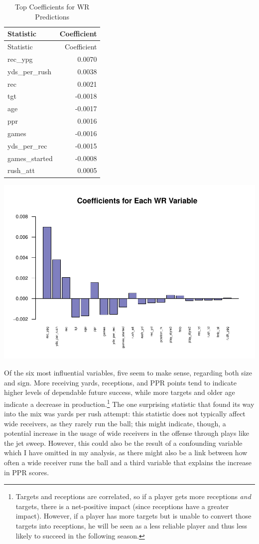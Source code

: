 \documentclass[
]{article}
\begin{document}
\begin{longtable}[]{@{}lr@{}}
\caption{Top Coefficients for WR Predictions}\tabularnewline
\toprule
Statistic & Coefficient \\
\midrule
\endfirsthead
\toprule
Statistic & Coefficient \\
\midrule
\endhead
rec\_ypg & 0.0070 \\
yds\_per\_rush & 0.0038 \\
rec & 0.0021 \\
tgt & -0.0018 \\
age & -0.0017 \\
ppr & 0.0016 \\
games & -0.0016 \\
yds\_per\_rec & -0.0015 \\
games\_started & -0.0008 \\
rush\_att & 0.0005 \\
\bottomrule
\end{longtable}

\begin{center}\includegraphics[width=0.85\linewidth]{stats_199_final_report_files/figure-latex/unnamed-chunk-14-1} \end{center}

\pagebreak

Of the six most influential variables, five seem to make sense,
regarding both size and sign. More receiving yards, receptions, and PPR
points tend to indicate higher levels of dependable future success,
while more targets and older age indicate a decrease in
production.\footnote{Targets and receptions are correlated, so if a
  player gets more receptions \emph{and} targets, there is a
  net-positive impact (since receptions have a greater impact). However,
  if a player has more targets but is unable to convert those targets
  into receptions, he will be seen as a less reliable player and thus
  less likely to succeed in the following season.} The one surprising
statistic that found its way into the mix was yards per rush attempt:
this statistic does not typically affect wide receivers, as they rarely
run the ball; this might indicate, though, a potential increase in the
usage of wide receivers in the offense through plays like the jet sweep.
However, this could also be the result of a confounding variable which I
have omitted in my analysis, as there might also be a link between how
often a wide receiver runs the ball and a third variable that explains
the increase in PPR scores.
\end{document}
